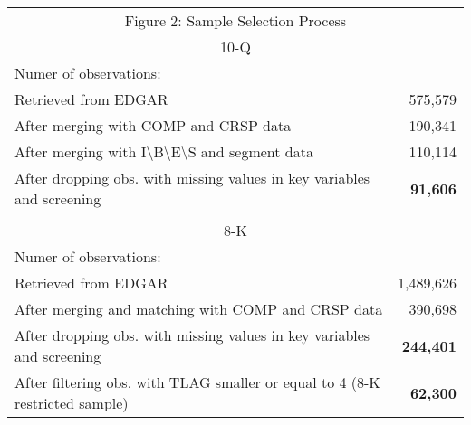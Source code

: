 \begin{table}[htbp] \label{fig2}
  \centering
    \begin{tabular}{lr}
    \multicolumn{2}{c}{Figure 2: Sample Selection Process} \\
    \multicolumn{2}{c}{10-Q} \\
    Numer of observations: &  \\
    Retrieved from EDGAR & 575,579 \\
    After merging with COMP and CRSP data & 190,341 \\
    After merging with I\textbackslash{}B\textbackslash{}E\textbackslash{}S and segment data & 110,114 \\
    After dropping obs. with missing values in key variables and screening & \textbf{91,606} \\
      &  \\
    \multicolumn{2}{c}{8-K} \\
    Numer of observations: &  \\
    Retrieved from EDGAR & 1,489,626 \\
    After merging and matching with COMP and CRSP data & 390,698 \\
    After dropping obs. with missing values in key variables and screening & \textbf{244,401} \\
    After filtering obs. with TLAG smaller or equal to 4 (8-K restricted sample) & \textbf{62,300} \\
    \end{tabular}%
\end{table}%
